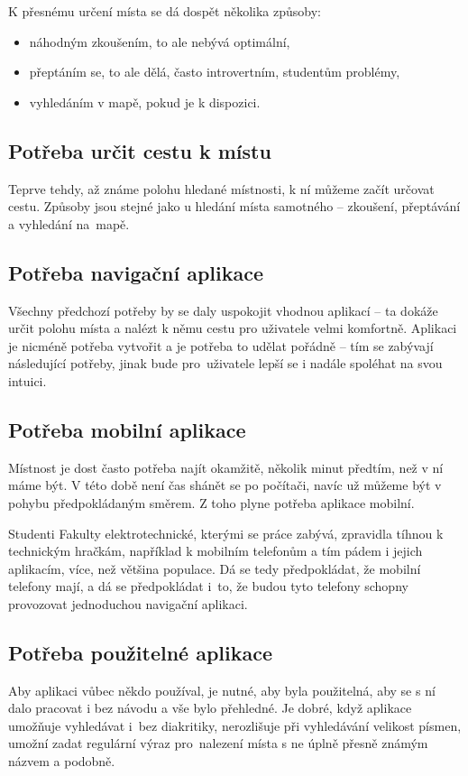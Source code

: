 K přesnému určení místa se dá dospět několika způsoby:
\begin{itemize}
\item náhodným zkoušením, to ale nebývá optimální,
\item přeptáním se, to ale dělá, často introvertním, studentům problémy,
\item vyhledáním v mapě, pokud je k dispozici.
\end{itemize}

\subsection{Potřeba určit cestu k místu}
Teprve tehdy, až známe polohu hledané místnosti, k ní můžeme začít určovat cestu. Způsoby jsou stejné jako u hledání místa samotného -- zkoušení, přeptávání a vyhledání na~mapě. 

\subsection{Potřeba navigační aplikace}
Všechny předchozí potřeby by se daly uspokojit vhodnou aplikací -- ta dokáže určit polohu místa a nalézt k němu cestu pro uživatele velmi komfortně. Aplikaci je nicméně potřeba vytvořit a je potřeba to udělat pořádně -- tím se zabývají následující potřeby, jinak bude pro~uživatele lepší se i nadále spoléhat na svou intuici.

\subsection{Potřeba mobilní aplikace}
Místnost je dost často potřeba najít okamžitě, několik minut předtím, než v ní máme být. V této době není čas shánět se po počítači, navíc už můžeme být v pohybu předpokládaným směrem. Z toho plyne potřeba aplikace mobilní.

Studenti Fakulty elektrotechnické, kterými se práce zabývá, zpravidla tíhnou k technickým hračkám, například k mobilním telefonům a tím pádem i jejich aplikacím, více, než většina populace. Dá se tedy předpokládat, že mobilní telefony mají, a dá se předpokládat i~to, že budou tyto telefony schopny provozovat jednoduchou navigační aplikaci.

\subsection{Potřeba použitelné aplikace}
Aby aplikaci vůbec někdo používal, je nutné, aby byla použitelná, aby se s ní dalo pracovat i bez návodu a vše bylo přehledné. Je dobré, když aplikace umožňuje vyhledávat i~bez diakritiky, nerozlišuje při vyhledávání velikost písmen, umožní zadat regulární výraz pro~nalezení místa s ne úplně přesně známým názvem a podobně.

